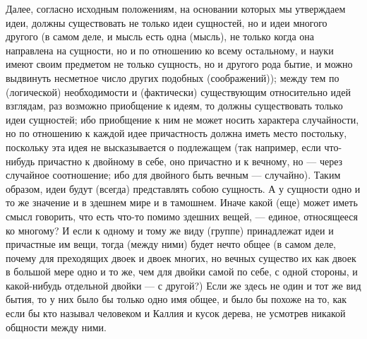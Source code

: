 \documentclass{article}
\begin{document}
Далее, согласно исходным положениям, на основании которых мы утверждаем идеи, должны существовать не только идеи сущностей, но и идеи многого другого (в самом деле, и мысль есть одна (мысль), не только когда она направлена на сущности, но и по отношению ко всему остальному, и науки имеют своим предметом не только сущность, но и другого рода бытие, и можно выдвинуть несметное число других подобных (соображений)); между тем по (логической) необходимости и (фактически) существующим относительно идей взглядам, раз возможно приобщение к идеям, то должны существовать только идеи сущностей; ибо приобщение к ним не может носить характера случайности, но по отношению к каждой идее причастность должна иметь место постольку, поскольку эта идея не высказывается о подлежащем
\footnotemark[11]
(так например, если что-нибудь причастно к двойному в себе, оно причастно и к вечному, но — через случайное соотношение; ибо для двойного быть вечным — случайно). Таким образом, идеи будут (всегда) представлять собою сущность.
\footnotemark[12]
А у сущности одно и то же значение и в здешнем мире и в тамошнем. Иначе какой (еще) может иметь смысл говорить, что есть что-то помимо здешних вещей, — единое, относящееся ко многому? И если к одному и тому же виду (группе)
\footnotemark[13]
принадлежат идеи и причастные им вещи, тогда (между ними) будет нечто общее (в самом деле, почему для преходящих двоек и двоек многих, но вечных
\footnotemark[14]
существо их как двоек в большой мере одно и то же, чем для двойки самой по себе, с одной стороны, и какой-нибудь отдельной двойки — с другой?) Если же здесь не один и тот же вид
\footnotemark[15]
бытия, то у них было бы только одно имя общее, и было бы похоже на то, как если бы кто называл человеком и Каллия и кусок дерева, не усмотрев никакой общности между ними.
\end{document}
